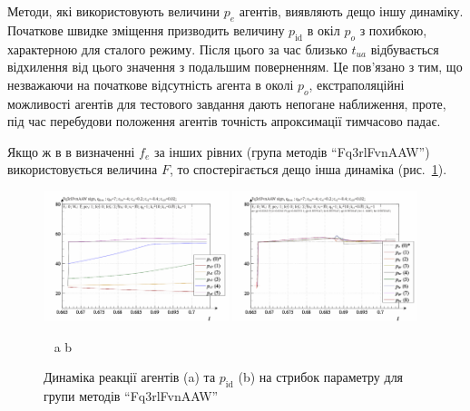 Методи, які використовують величини
$p_e$ агентів, виявляють дещо іншу динаміку. Початкове швидке
зміщення призводить величину
$ p_\mathrm{id} $ в окіл
$ p_o $ з похибкою, характерною для сталого режиму. Після цього за
час близько
$ t_{ua} $ відбувається відхилення від цього значення з подальшим
поверненням. Це пов'язано з тим, що незважаючи на початкове
відсутність агента в околі
$p_o$, екстраполяційні можливості агентів для тестового завдання
дають непогане наближення, проте, під час перебудови положення
агентів точність апроксимації тимчасово падає.


Якщо ж в в визначенні
$ f_e $ за інших рівних (група методів ``Fq3rlFvnAAW'') використовується
величина
$F$, то спостерігається дещо інша динаміка (рис.~\ref{atu:f:Fq3rlFvnAAW_sign}).

\begin{figure}[htb!]
  \begin{center}
    \includegraphics[width=0.48\textwidth]{p/sign/qls-p_t_pi_m_Fq3rlFvnAAW_sign.png}
    \hfill
    \includegraphics[width=0.48\textwidth]{p/sign/qls-p_t_p_m_Fq3rlFvnAAW_sign.png}
  \end{center}
  \vspace{-1.0ex}
  \begin{center}
    ~ \hfill a \hfill\hfill b  \hfill ~
  \end{center}
  \vspace{-1.5ex}
  \caption{Динаміка реакції агентів (a) та $p_\mathrm{id}$ (b) на стрибок параметру для групи методів ``Fq3rlFvnAAW''}
  \label{atu:f:Fq3rlFvnAAW_sign}
\end{figure}

